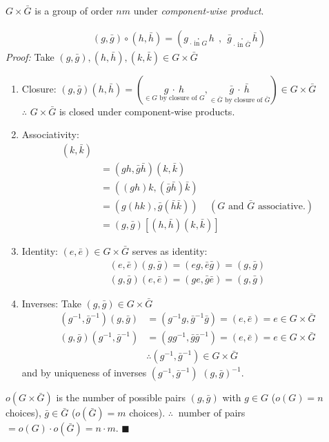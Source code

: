 \begin{proposition}
    $G\times \bar{G}$ is a group of order $nm$ under \textit{component-wise product}.\steezybreak

    \begin{align}
        (g,\bar{g})\circ (h,\bar{h}) = (g \underset{\cdot \text{ in } G}{\cdot} h \ \ , \ \  \bar{g}\underset{\cdot \text{ in }\bar{G}}{\cdot}\bar{h}) \nonumber
    \end{align}
    \textit{Proof:} Take $(g,\bar{g}), (h,\bar{h}), (k,\bar{k})\in G\times \bar{G}$
    \begin{enumerate}
        \item Closure:
        $(g,\bar{g})(h,\bar{h})= (\underset{\in G \text{ by closure of } G}{g \ \cdot \ h},\underset{\in \bar{G} \text{ by closure of } \bar{G}}{\bar{g}\ \cdot \ \bar{h}}) \in G\times \bar{G}$
        \\ $\therefore$ $G\times \bar{G}$ is closed under component-wise products.
        \item Associativity:
        \begin{align}
            [(g,\bar{g})(h,\bar{h})](k,\bar{k}) & \nonumber \\
            &= (gh,\bar{g}\bar{h})(k,\bar{k}) \nonumber \\
            &= ((gh)k,(\bar{g}\bar{h})\bar{k}) \nonumber \\
            &= (g(hk),\bar{g}(\bar{h}\bar{k})) \ \ \ \ \ (G \text{ and } \bar{G} \text{ associative.}) \nonumber \\
            &= (g,\bar{g})[(h,\bar{h})(k,\bar{k})]\nonumber
        \end{align}
        \item Identity: $(e,\bar{e}) \in G\times \bar{G}$ serves as identity:
        \begin{align}
            (e,\bar{e})(g,\bar{g})=(eg,\bar{e}\bar{g})= (g,\bar{g}) \nonumber \\
            (g,\bar{g})(e,\bar{e})=(ge,\bar{g}\bar{e})=(g,\bar{g}) \nonumber
        \end{align}
        \item Inverses: Take $(g,\bar{g})\in G\times \bar{G}$
        \begin{align}
            (g^{-1},\bar{g}^{-1})(g,\bar{g}) &= (g^{-1}g,\bar{g}^{-1}\bar{g})=(e,\bar{e})=e\in G\times \bar{G} \nonumber \\
            (g,\bar{g})(g^{-1},\bar{g}^{-1}) &= (gg^{-1},\bar{g}\bar{g}^{-1})=(e,\bar{e}) = e \in G\times \bar{G} \nonumber \\
            &\therefore (g^{-1},\bar{g}^{-1})\in G\times \bar{G} \nonumber
        \end{align}
        and by uniqueness of inverses $(g^{-1},\bar{g}^{-1})$  $(g,\bar{g})^{-1}$. \\
    \end{enumerate}
    $o(G\times \bar{G})$ is the number of possible pairs $(g,\bar{g})$ with $g\in G$ ($o(G)=n$
    choices), $\bar{g}\in \bar{G}$ ($o(\bar{G})=m$ choices).
    \noindent $\therefore \ $ number of pairs $=o(G)\cdot o(\bar{G})=n\cdot m$. $\blacksquare$
    \steezybreak


\end{proposition}

